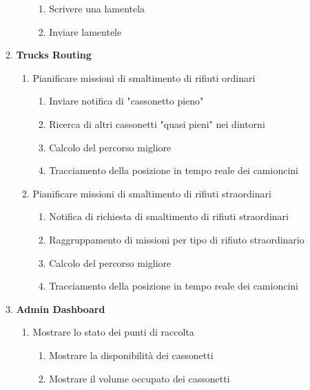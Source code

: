 \begin{itemize}
\begin{enumerate}[label*=\arabic*.]
\begin{enumerate}[label*=\arabic*.]
            \begin{enumerate}[label*=\arabic*.]
                \item Scrivere una lamentela
                \item Inviare lamentele
            \end{enumerate}
        \end{enumerate}
        \item \textbf{Trucks Routing}
        \begin{enumerate}[label*=\arabic*.]
            \item Pianificare missioni di smaltimento di rifiuti ordinari
            \begin{enumerate}[label*=\arabic*.]
                \item Inviare notifica di "cassonetto pieno"
                \item Ricerca di altri cassonetti "quasi pieni" nei dintorni
                \item Calcolo del percorso migliore
                \item Tracciamento della posizione in tempo reale dei camioncini
            \end{enumerate}
            \item Pianificare missioni di smaltimento di rifiuti straordinari
            \begin{enumerate}[label*=\arabic*.]
                \item Notifica di richiesta di smaltimento di rifiuti straordinari
                \item Raggruppamento di missioni per tipo di rifiuto straordinario
                \item Calcolo del percorso migliore
                \item Tracciamento della posizione in tempo reale dei camioncini
            \end{enumerate}
        \end{enumerate}
        \item \textbf{Admin Dashboard}
        \begin{enumerate}[label*=\arabic*.]
            \item Mostrare lo stato dei punti di raccolta
            \begin{enumerate}[label*=\arabic*.]
                \item Mostrare la disponibilità dei cassonetti
                \item Mostrare il volume occupato dei cassonetti

\end{enumerate}
\end{enumerate}
\end{enumerate}
\end{itemize}
